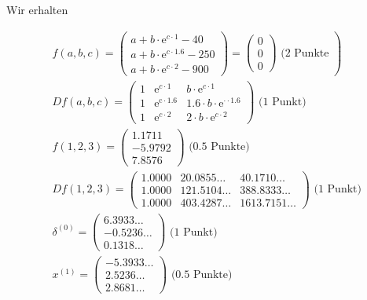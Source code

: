 \documentclass[10pt]{article}
\begin{document}
Wir erhalten

$$
\begin{aligned}
& \left.f(a, b, c)=\left(\begin{array}{c}
a+b \cdot \mathrm{e}^{c \cdot 1}-40 \\
a+b \cdot \mathrm{e}^{c \cdot 1.6}-250 \\
a+b \cdot \mathrm{e}^{c \cdot 2}-900
\end{array}\right)=\left(\begin{array}{l}
0 \\
0 \\
0
\end{array}\right) \text { (2 Punkte }\right) \\
& D f(a, b, c)=\left(\begin{array}{ccr}
1 & \mathrm{e}^{c \cdot 1} & b \cdot \mathrm{e}^{c \cdot 1} \\
1 & \mathrm{e}^{\mathrm{c} \cdot 1.6} & 1.6 \cdot b \cdot \mathrm{e}^{\cdot \cdot 1.6} \\
1 & \mathrm{e}^{c \cdot 2} & 2 \cdot b \cdot \mathrm{e}^{c \cdot 2}
\end{array}\right) \text { (1 Punkt) } \\
& f(1,2,3)=\left(\begin{array}{c}
1.1711 \\
-5.9792 \\
7.8576
\end{array}\right) \text { (0.5 Punkte) } \\
& D f(1,2,3)=\left(\begin{array}{rrr}
1.0000 & 20.0855 \ldots & 40.1710 \ldots \\
1.0000 & 121.5104 \ldots & 388.8333 \ldots \\
1.0000 & 403.4287 \ldots & 1613.7151 \ldots
\end{array}\right) \text { (1 Punkt) } \\
& \delta^{(0)}=\left(\begin{array}{r}
6.3933 \ldots \\
-0.5236 \ldots \\
0.1318 \ldots
\end{array}\right) \text { (1 Punkt) } \\
& x^{(1)}=\left(\begin{array}{r}
-5.3933 \ldots \\
2.5236 \ldots \\
2.8681 \ldots
\end{array}\right) \text { (0.5 Punkte) }
\end{aligned}
$$
\end{document}
